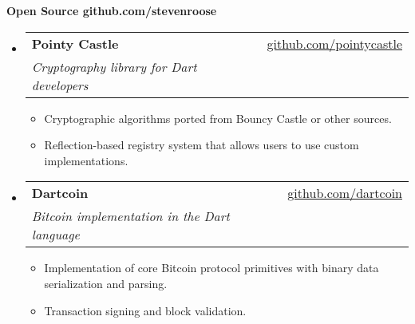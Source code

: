 \documentclass[letterpaper,11pt]{article}
\makeatletter
\newcommand{\resheading}[1]{{\large \colorbox{mygrey}{\begin{minipage}{\textwidth}{\textbf{#1 \vphantom{p\^{E}}}}\end{minipage}}}}
\newcommand{\ressubheading}[4]{
\begin{tabular*}{7.3in}{l@{\extracolsep{\fill}}r}
		\textbf{#1} & #2 \\
		\textit{#3} & \textit{#4} \\
\end{tabular*}\vspace{-6pt}}
\newcommand{\resitem}[1]{\item #1 \vspace{-2pt}}
\makeatother
\begin{document}
\resheading{Open Source \hfill github.com/stevenroose}
\begin{itemize}[leftmargin=*]

\item[]
	\ressubheading{Pointy Castle}{\href{https://github.com/pointycastle}{github.com/pointycastle}}{Cryptography library for Dart developers}{ }
	\begin{itemize}
		\resitem{Cryptographic algorithms ported from Bouncy Castle or other sources.}
		\resitem{Reflection-based registry system that allows users to use custom implementations.}
	\end{itemize}

\item[]
	\ressubheading{Dartcoin}{\href{https://github.com/dartcoin}{github.com/dartcoin}}{Bitcoin implementation in the Dart language}{ }
	\begin{itemize}
		\resitem{Implementation of core Bitcoin protocol primitives with binary data serialization and parsing.}
		\resitem{Transaction signing and block validation.}
	\end{itemize}

\end{itemize}

\newpage
\end{document}
